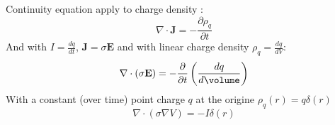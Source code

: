 \documentclass[twocolumn]{article}
\numberwithin{equation}{section}
\begin{document}
Continuity equation apply to charge density :
\[  \nabla \cdot \mathbf{J} = - \frac{\partial \rho_q}{ \partial t}  \]
And with $I = \frac{dq}{dt}$, $\mathbf{J} = \sigma \mathbf{E}$ and with linear charge density  $\rho_q =\frac{d q}{d V}$:
\[ \nabla \cdot (\sigma \mathbf{E}) = -\frac{\partial}{\partial t} \left(  \frac{dq}{d\volume}\right)\]
With a constant (over time) point charge $q$ at the origine $\rho_q(r) = q\delta(r)$
\[ \nabla \cdot (\sigma \nabla V) =-I \delta (r) \]










	
	
\end{document}
